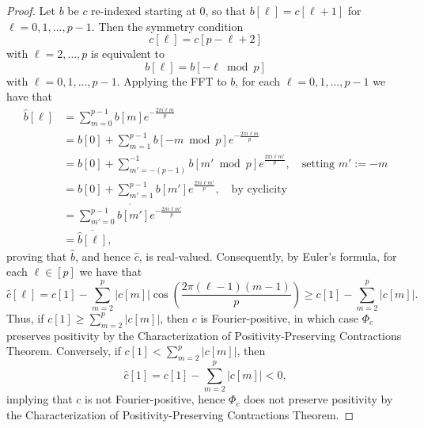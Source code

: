 \documentclass[11pt]{article}
\begin{document}
\begin{proof}
    Let $b$ be $c$ re-indexed starting at $0$, so that $b[\ell]  = c[\ell+1]$ for $\ell=0,1,\dots,p-1$. Then the symmetry condition
    \[c[\ell] = c[p-\ell+2]\]
    with $\ell=2,\dots,p$ is equivalent to 
    \[b[\ell] = b[-\ell\bmod p]\]
    with $\ell=0,1,\dots,p-1$. Applying the FFT to $b$, for each $\ell=0,1,\dots,p-1$ we have that  
    \begin{align*}
        \widehat{b}[\ell] &= \sum\limits_{m=0}^{p-1}b[m]e^{-\frac{2\pi i \ell m}{p}} \\
        &= b[0] + \sum\limits_{m=1}^{p-1}b[-m\bmod p]e^{-\frac{2\pi i \ell m}{p}} \\
        &= b[0] + \sum\limits_{m'=-(p-1)}^{-1}b[m'\bmod p]e^{\frac{2\pi i \ell m'}{p}},\quad \text{setting }m':=-m \\
        &= b[0] + \sum\limits_{m'=1}^{p-1}b[m']e^{\frac{2\pi i \ell m'}{p}},\quad \text{by cyclicity} \\
        &= \overline{\sum\limits_{m'=0}^{p-1}b[m']e^{-\frac{2\pi i \ell m'}{p}}} \\
        &= \overline{\widehat{b}[\ell]},
    \end{align*}
    proving that $\widehat{b}$, and hence $\widehat{c}$, is real-valued. Consequently, by Euler's formula, for each $\ell\in [p]$ we have that 
    \[\widehat{c}[\ell] = c[1] - \sum\limits_{m=2}^p|c[m]|\cos\left(\frac{2\pi (\ell-1)(m-1)}{p}\right) \geq c[1]-\sum\limits_{m=2}^p|c[m]|.\]
    Thus, if $c[1] \geq \sum\limits_{m=2}^p|c[m]|$, then $c$ is Fourier-positive, in which case $\Phi_c$ preserves positivity by the Characterization of Positivity-Preserving Contractions Theorem. Conversely, if $c[1] < \sum\limits_{m=2}^p|c[m]|$, then 
    \[\widehat{c}[1] = c[1] - \sum\limits_{m=2}^p|c[m]| < 0,\]
    implying that $c$ is not Fourier-positive, hence $\Phi_c$ does not preserve positivity by the Characterization of Positivity-Preserving Contractions Theorem. 
\end{proof}
\end{document}
